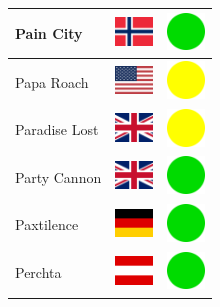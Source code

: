 \documentclass[12pt, a4paper, twoside]{report}
\begin{document}
\begin{center}
\begin{longtable}{|p{5cm}|p{2cm}|p{2cm}|}
 Pain City                                                  & \includegraphics[width=1cm]{../4x3/no} &   \includegraphics[width=1cm]{../likes/y} \\ \hline
 Papa Roach                                                 & \includegraphics[width=1cm]{../4x3/us} &   \includegraphics[width=1cm]{../likes/m} \\ \hline
 Paradise Lost                                              & \includegraphics[width=1cm]{../4x3/gb} &   \includegraphics[width=1cm]{../likes/m} \\ \hline
 Party Cannon                                               & \includegraphics[width=1cm]{../4x3/gb} &   \includegraphics[width=1cm]{../likes/y} \\ \hline
 Paxtilence                                                 & \includegraphics[width=1cm]{../4x3/de} &   \includegraphics[width=1cm]{../likes/y} \\ \hline
 Perchta                                                    & \includegraphics[width=1cm]{../4x3/at} &   \includegraphics[width=1cm]{../likes/y} \\ \hline

\end{longtable}
\end{center}
\end{document}
